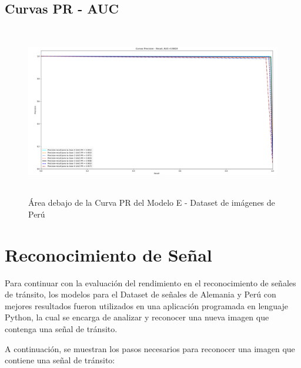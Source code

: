 		\subsection{Curvas PR - AUC}  
					\begin{figure}[H]
						\includegraphics[width=1\textwidth, height=7.5cm]{images/desarrollo/testResults/peru/PR_curve_modelE} 
						\begin{center}
						\caption{\small{Área debajo de la Curva PR del Modelo E - Dataset de imágenes de Perú}}
						{\small{\fontsize{10}{16.8}\selectfont {Fuente: Elaboración propia}}}
						\end{center}
						\vspace{-1.5em}
					\end{figure}
	\newpage
	
	
		
	\section{Reconocimiento de Señal}
		Para continuar con la evaluación del rendimiento en el reconocimiento de señales de tránsito, los modelos para el Dataset de señales de Alemania y Perú con mejores resultados fueron utilizados en una aplicación programada en lenguaje Python, la cual se encarga de analizar y reconocer una nueva imagen que contenga una señal de tránsito.

		A continuación, se muestran los pasos necesarios para reconocer una imagen que contiene una señal de tránsito:

